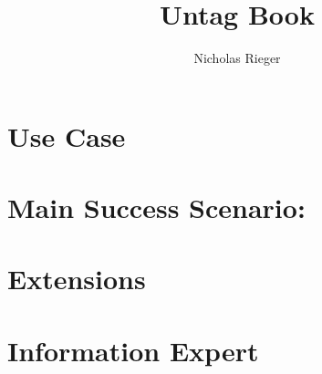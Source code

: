 \documentclass{article}
\title{Untag Book}
\author{Nicholas Rieger}
\begin{document}
\maketitle

\section*{Use Case}

\section*{Main Success Scenario:}

\section*{Extensions}

\section*{Information Expert}
\end{document}
